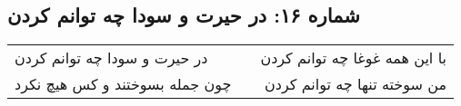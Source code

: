 \begin{center}
\section*{شماره ۱۶: در حیرت و سودا چه توانم کردن}
\label{sec:016}
\begin{longtable}{l p{0.5cm} r}
در حیرت و سودا چه توانم کردن
&&
با این همه غوغا چه توانم کردن
\\
چون جمله بسوختند و کس هیچ نکرد
&&
من سوخته تنها چه توانم کردن
\\
\end{longtable}
\end{center}
